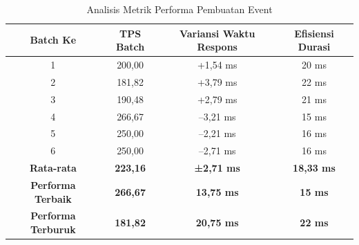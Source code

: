 \begin{table}[h!]
  \centering
  \begin{tabular}{|c|c|c|c|}
    \hline
    \textbf{Batch Ke}          & \textbf{TPS Batch} & \textbf{Variansi Waktu Respons} & \textbf{Efisiensi Durasi} \\
    \hline
    1                          & 200,00             & +1,54 ms                        & 20 ms                     \\
    \hline
    2                          & 181,82             & +3,79 ms                        & 22 ms                     \\
    \hline
    3                          & 190,48             & +2,79 ms                        & 21 ms                     \\
    \hline
    4                          & 266,67             & –3,21 ms                        & 15 ms                     \\
    \hline
    5                          & 250,00             & –2,21 ms                        & 16 ms                     \\
    \hline
    6                          & 250,00             & –2,71 ms                        & 16 ms                     \\
    \hline
    \hline
    \textbf{Rata-rata}         & \textbf{223,16}    & \textbf{±2,71 ms}               & \textbf{18,33 ms}         \\
    \hline
    \textbf{Performa Terbaik}  & \textbf{266,67}    & \textbf{13,75 ms}               & \textbf{15 ms}            \\
    \hline
    \textbf{Performa Terburuk} & \textbf{181,82}    & \textbf{20,75 ms}               & \textbf{22 ms}            \\
    \hline
  \end{tabular}
  \caption{Analisis Metrik Performa Pembuatan Event}
  \label{tab:event_creation_metrics}

\end{table}
